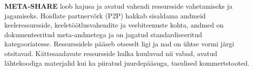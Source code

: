 \begin{multicols}{2}

\textbf{META-SHARE} loob hajusa ja avatud vahendi ressursside vahetamiseks ja jagamiseks. Hoidlate partnervõrk (P2P) hakkab sisaldama andmeid keeleressursside, keeletöötlusvahendite ja veebiteenuste kohta, andmed on dokumenteeritud meta-andmetega ja on jagatud standardiseeritud kategooriatesse. Ressurssidele pääseb otseselt ligi ja nad on ühtse vormi järgi otsitavad. Kättesaadavate ressursside hulka kuuluvad nii vabad, avatud lähtekoodiga materjalid kui ka piiratud juurdepääsuga, tasulised kommertstooted.


\end{multicols}
